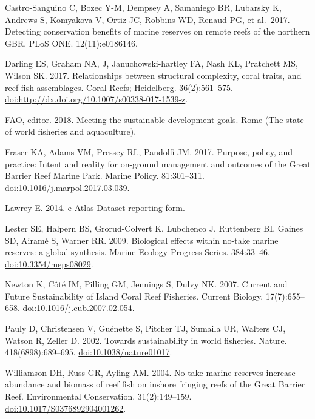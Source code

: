 \documentclass[12pt,]{article}
\begin{document}
Castro-Sanguino C, Bozec Y-M, Dempsey A, Samaniego BR, Lubarsky K,
Andrews S, Komyakova V, Ortiz JC, Robbins WD, Renaud PG, et al.~2017.
Detecting conservation benefits of marine reserves on remote reefs of
the northern GBR. PLoS ONE. 12(11):e0186146.

Darling ES, Graham NA, J, Januchowski-hartley FA, Nash KL, Pratchett MS,
Wilson SK. 2017. Relationships between structural complexity, coral
traits, and reef fish assemblages. Coral Reefs; Heidelberg.
36(2):561--575. \url{doi:http://dx.doi.org/10.1007/s00338-017-1539-z}.

FAO, editor. 2018. Meeting the sustainable development goals. Rome (The
state of world fisheries and aquaculture).

Fraser KA, Adams VM, Pressey RL, Pandolfi JM. 2017. Purpose, policy, and
practice: Intent and reality for on-ground management and outcomes of
the Great Barrier Reef Marine Park. Marine Policy. 81:301--311.
\url{doi:10.1016/j.marpol.2017.03.039}.

Lawrey E. 2014. e-Atlas Dataset reporting form.

Lester SE, Halpern BS, Grorud-Colvert K, Lubchenco J, Ruttenberg BI,
Gaines SD, Airamé S, Warner RR. 2009. Biological effects within no-take
marine reserves: a global synthesis. Marine Ecology Progress Series.
384:33--46. \url{doi:10.3354/meps08029}.

Newton K, Côté IM, Pilling GM, Jennings S, Dulvy NK. 2007. Current and
Future Sustainability of Island Coral Reef Fisheries. Current Biology.
17(7):655--658. \url{doi:10.1016/j.cub.2007.02.054}.

Pauly D, Christensen V, Guénette S, Pitcher TJ, Sumaila UR, Walters CJ,
Watson R, Zeller D. 2002. Towards sustainability in world fisheries.
Nature. 418(6898):689--695. \url{doi:10.1038/nature01017}.

Williamson DH, Russ GR, Ayling AM. 2004. No-take marine reserves
increase abundance and biomass of reef fish on inshore fringing reefs of
the Great Barrier Reef. Environmental Conservation. 31(2):149--159.
\url{doi:10.1017/S0376892904001262}.
\end{document}
